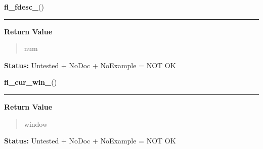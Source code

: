     \label{xformslib:library:fl_fdesc_}

    \vspace{0.5ex}

\hspace{.8\funcindent}\begin{boxedminipage}{\funcwidth}

    \raggedright \textbf{fl\_fdesc\_}()

    \vspace{-1.5ex}

    \rule{\textwidth}{0.5\fboxrule}
\setlength{\parskip}{2ex}
\setlength{\parskip}{1ex}
      \textbf{Return Value}
    \vspace{-1ex}

      \begin{quote}
      num

      \end{quote}

\textbf{Status:} Untested + NoDoc + NoExample = NOT OK



    \end{boxedminipage}

    \label{xformslib:library:fl_cur_win_}

    \vspace{0.5ex}

\hspace{.8\funcindent}\begin{boxedminipage}{\funcwidth}

    \raggedright \textbf{fl\_cur\_win\_}()

    \vspace{-1.5ex}

    \rule{\textwidth}{0.5\fboxrule}
\setlength{\parskip}{2ex}
\setlength{\parskip}{1ex}
      \textbf{Return Value}
    \vspace{-1ex}

      \begin{quote}
      window

      \end{quote}

\textbf{Status:} Untested + NoDoc + NoExample = NOT OK



    \end{boxedminipage}

